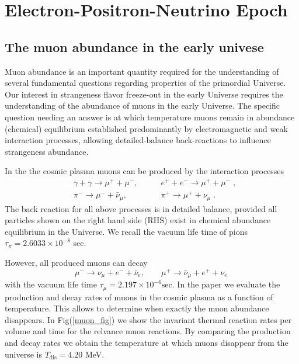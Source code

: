 \documentclass[Universe,article,submit,moreauthors,pdftex]{Definitions/mdpi}
\begin{document}
\section{Electron-Positron-Neutrino Epoch}\label{sec:ElectronPositronNeutrino}
\subsection{The muon abundance in the early univese}\label{sec:Muons}
Muon abundance is an important quantity required for the understanding of several fundamental questions regarding properties of the primordial Universe. Our interest in strangeness flavor freeze-out in the early Universe \cite{Yang:2021bko} requires the understanding of the abundance of muons in the early Universe. The specific question needing an answer is at which temperature muons remain in abundance (chemical) equilibrium established predominantly by electromagnetic and weak interaction processes, allowing detailed-balance back-reactions to influence strangeness abundance.

In the the cosmic plasma muons can be produced by the interaction processes 
\begin{align} 
&\gamma+\gamma\longrightarrow\mu^++\mu^-,\qquad & e^++e^-\longrightarrow \mu^++\mu^-\;,\\
&\pi^-\longrightarrow\mu^-+\bar{\nu}_\mu,\qquad & \pi^+\longrightarrow\mu^++\nu_\mu\;.
\end{align}
The back reaction for all above processes is in detailed balance, provided all particles shown on the right hand side (RHS) exist in chemical abundance equilibrium in the Universe. We recall the vacuum life time of pions $\tau_\pi=2.6033\times10^{-8}$ sec. 

However, all produced muons can decay 
\begin{equation}
\mu^-\rightarrow\nu_\mu+e^-+\bar{\nu}_e,\qquad \mu^+\rightarrow\bar{\nu}_\mu+e^++\nu_e\,
\end{equation} 
with the vacuum life time $\tau_{\mu}=2.197 \times 10^{-6}\mathrm{sec}$. In the paper \cite{Rafelski:2021aey} we evaluate the production and decay rates of muons in the cosmic plasma as a function of temperature. This allows to determine when exactly the muon abundance disappears. In Fig(\ref{muon_fig}) we show the invariant thermal reaction rates per volume and time for the relvance muon reactions. By comparing the production and decay rates we obtain the temperature at which muons disappear from the universe is $T_\mathrm{dis} = 4.20$ MeV.
\end{document}
